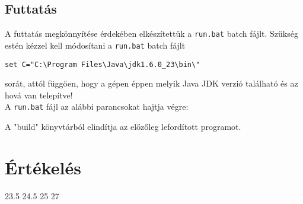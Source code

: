 \subsection{Futtatás}
A futtatás megkönnyítése érdekében elkészítettük a \texttt{run.bat} batch fájlt.
Szükség estén kézzel kell módosítani a \texttt{run.bat} batch fájlt
\begin{verbatim}
set C="C:\Program Files\Java\jdk1.6.0_23\bin\"
\end{verbatim} sorát, attól függően, hogy a gépen éppen melyik Java JDK verzió található és az hová van telepítve!\\
A \texttt{run.bat} fájl az alábbi parancsokat hajtja végre:

A "build" könyvtárból elindítja az előzőleg lefordított programot.

\section{Értékelés}

\begin{ertekeles}
{23.5}        %
{24.5}
{25}
{27}
\end{ertekeles}

